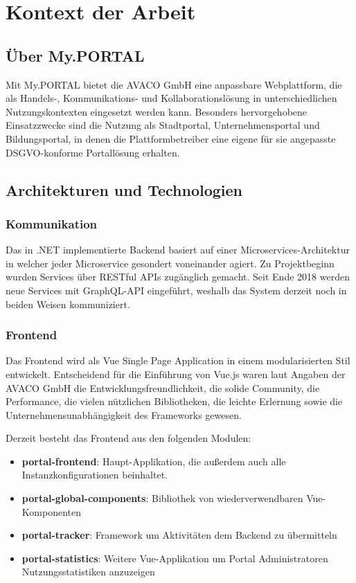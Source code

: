 \chapter{Kontext der Arbeit}
\label{chaKontext der Arbeit}
\section{Über My.PORTAL}
Mit My.PORTAL bietet die AVACO GmbH eine anpassbare Webplattform, die als Handels-,
Kommunikations- und Kollaborationslösung in unterschiedlichen Nutzungskontexten eingesetzt werden kann. Besonders hervorgehobene Einsatzzwecke sind die Nutzung als Stadtportal, Unternehmensportal und Bildungsportal, in denen die Plattformbetreiber eine eigene für sie angepasste DSGVO-konforme Portallösung erhalten. \citep{AVACOWebsite}

\section{Architekturen und Technologien}
\subsection{Kommunikation} %
Das in .NET implementierte Backend basiert auf einer Microservices-Architektur in welcher jeder Microservice gesondert voneinander agiert.  
Zu Projektbeginn wurden Services über RESTful APIs zugänglich gemacht. Seit Ende 2018 werden neue Services mit GraphQL-API eingeführt, weshalb das System derzeit noch in beiden Weisen kommuniziert.

\subsection{Frontend} %
Das Frontend wird als Vue Single Page Application in einem modularisierten Stil entwickelt. Entscheidend für die Einführung von Vue.js waren laut Angaben der AVACO GmbH die Entwicklungsfreundlichkeit, die solide Community, die Performance, die vielen nützlichen Bibliotheken, die leichte Erlernung sowie die Unternehmensunabhängigkeit des Frameworks gewesen.

Derzeit besteht das Frontend aus den folgenden Modulen:
\begin{itemize}
 \item \textbf{portal-frontend}: Haupt-Applikation, die außerdem auch alle Instanzkonfigurationen beinhaltet.
 \item \textbf{portal-global-components}: Bibliothek von wiederverwendbaren Vue-Komponenten
 \item \textbf{portal-tracker}: Framework um Aktivitäten dem Backend zu übermitteln
 \item \textbf{portal-statistics}: Weitere Vue-Applikation um Portal Administratoren Nutzungsstatistiken anzuzeigen
\end{itemize}
